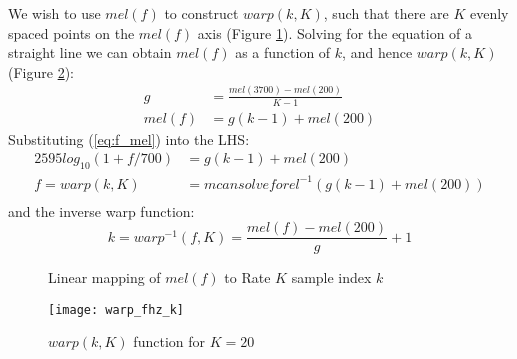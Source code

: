 \documentclass{article}
\begin{document}
We wish to use $mel(f)$ to construct $warp(k,K)$, such that there are $K$ evenly spaced points on the $mel(f)$ axis (Figure \ref{fig:mel_k}).  Solving for the equation of a straight line we can obtain $mel(f)$ as a function of $k$, and hence $warp(k,K)$ (Figure \ref{fig:warp_fhz_k}):
\begin{equation} \label{eq:mel_k}
\begin{split}
g &= \frac{mel(3700)-mel(200)}{K-1} \\
mel(f) &= g(k-1) + mel(200)
\end{split}
\end{equation}
Substituting (\ref{eq:f_mel}) into the LHS:
\begin{equation} \label{eq:warp}
\begin{split}
2595log_{10}(1+f/700) &= g(k-1) + mel(200) \\
f = warp(k,K) &= mcan solve forel^{-1} ( g(k-1) + mel(200) ) \\
\end{split}
\end{equation}
and the inverse warp function:
\begin{equation} \label{warp_inv}
k = warp^{-1}(f,K) = \frac{mel(f)-mel(200)}{g} + 1
\end{equation}

\begin{figure}[h]
\caption{Linear mapping of $mel(f)$ to Rate $K$ sample index $k$}
\vspace{5mm}
\label{fig:mel_k}
\centering
{}
\end{figure}

\begin{figure}[h]
\caption{$warp(k,K)$ function for $K=20$}
\label{fig:warp_fhz_k}
\begin{center}
\texttt{[image: warp\_fhz\_k]}
\end{center}
\end{figure}
\end{document}
